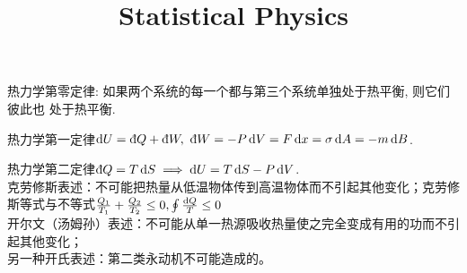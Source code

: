 \documentclass[UTF8,9pt]{ctexart}
\title{Statistical Physics}
\newcommand{\q}[1]{{\color{red} #1}}
\begin{document}
 
\maketitle
{}
    \q{热力学第零定律}: 如果两个系统的每一个都与第三个系统单独处于热平衡, 则它们彼此也
    处于热平衡.

    \q{热力学第一定律}$\d U=\dbar Q+\dbar W,\ \dbar W=-P\d V=F\d x=\sg \d A = -m\d B$. 

    \q{热力学第二定律}$\dbar Q = T\d S \ip \d U = T\d S -P\d V$. \\
    克劳修斯表述：不可能把热量从低温物体传到高温物体而不引起其他变化；克劳修斯等式与不等式$\frac{Q_{1}}{T_{1}}+\frac{Q_{2}}{T_{2}} \leq 0,\oint \frac{\mathop{}\!\mathrm{d} Q}{T}\leq 0$\\
    开尔文（汤姆孙）表述：不可能从单一热源吸收热量使之完全变成有用的功而不引起其他变化；\\
    另一种开氏表述：第二类永动机不可能造成的。
    
\end{document}
